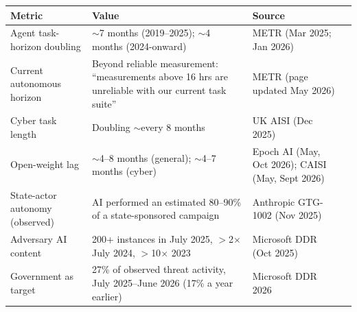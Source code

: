 \documentclass[11pt,letterpaper]{article}
\begin{document}
\begin{criticalbox}
\begin{center}
\small
\begin{tabularx}{\linewidth}{ZY{0.94}Y{1.2}Y{0.86}}
\toprule
\textbf{Metric} & \textbf{Value} & \textbf{Source} \\
\midrule
Agent task-horizon doubling & $\sim$7 months (2019--2025); $\sim$4 months (2024-onward) & METR (Mar 2025; Jan 2026) \\
Current autonomous horizon & Beyond reliable measurement: ``measurements above 16 hrs are unreliable with our current task suite'' & METR (page updated May 2026) \\
Cyber task length & Doubling $\sim$every 8 months & UK AISI (Dec 2025) \\
Open-weight lag & $\sim$4--8 months (general); $\sim$4--7 months (cyber) & Epoch AI (May, Oct 2026); CAISI (May, Sept 2026) \\
State-actor autonomy (observed) & AI performed an estimated 80--90\% of a state-sponsored campaign & Anthropic GTG-1002 (Nov 2025) \\
Adversary AI content & 200+ instances in July 2025, $>$2$\times$ July 2024, $>$10$\times$ 2023 & Microsoft DDR (Oct 2025) \\
Government as target & 27\% of observed threat activity, July 2025--June 2026 (17\% a year earlier) & Microsoft DDR 2026 \\
\bottomrule
\end{tabularx}
\end{center}


\end{criticalbox}
\end{document}
